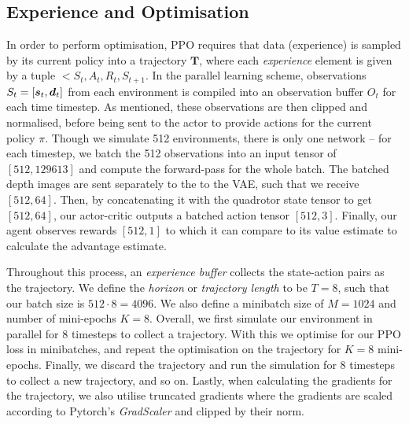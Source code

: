 \subsection{Experience and Optimisation}
In order to perform optimisation, PPO requires that data (experience) is sampled by its current policy into a trajectory $\boldsymbol{T}$, where each \textit{experience} element is given by a tuple $<S_t, A_t, R_t, S_{t+1}$. In the parallel learning scheme, observations $S_t = [{\boldsymbol{s}}_t, {\boldsymbol{d}}_t]$ from each environment is compiled into an observation buffer $O_t$ for each time timestep. As mentioned, these observations are then clipped and normalised, before being sent to the actor to provide actions for the current policy $\pi$. Though we simulate 512 environments, there is only one network -- for each timestep, we batch the 512 observations into an input tensor of $[512, 129613]$ and compute the forward-pass for the whole batch. The batched depth images are sent separately to the to the VAE, such that we receive $[512, 64]$. Then, by concatenating it with the quadrotor state tensor to get $[512, 64]$, our actor-critic outputs a batched action tensor $[512, 3]$. Finally, our agent observes rewards $[512, 1]$ to which it can compare to its value estimate to calculate the advantage estimate.

Throughout this process, an \textit{experience buffer} collects the state-action pairs as the trajectory. We define the \textit{horizon} or \textit{trajectory length} to be $T=8$, such that our batch size is $512\cdot8 = 4096$. We also define a minibatch size of $M=1024$ and number of mini-epochs $K=8$. Overall, we first simulate our environment in parallel for 8 timesteps to collect a trajectory. With this we optimise for our PPO loss in minibatches, and repeat the optimisation on the trajectory for $K=8$ mini-epochs. Finally, we discard the trajectory and run the simulation for 8 timesteps to collect a new trajectory, and so on. Lastly, when calculating the gradients for the trajectory, we also utilise truncated gradients where the gradients are scaled according to Pytorch's \textit{GradScaler} and clipped by their norm.


